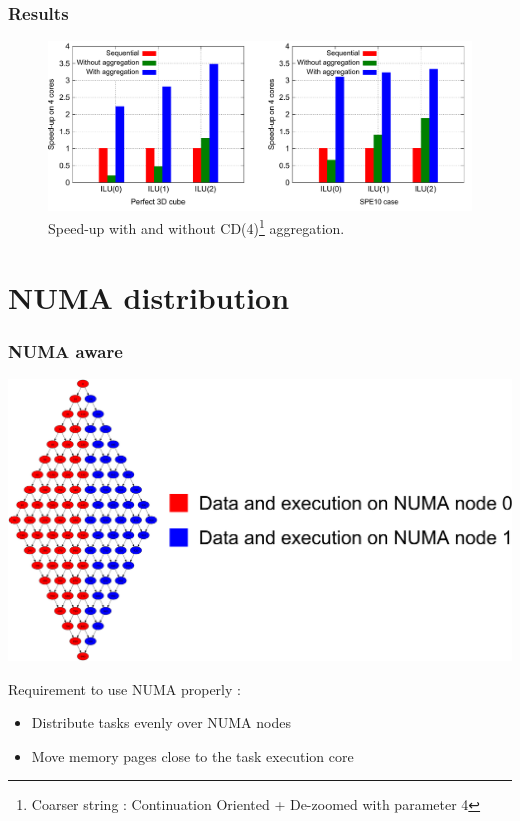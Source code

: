 \documentclass{beamer}
\begin{document}
\begin{frame}
  \frametitle{Results}
  
  \begin{figure}[t!]
    \centering
    \includegraphics[width=\linewidth]{agg_cube_100_spe10}
    \caption{Speed-up with and without CD(4)\footnote{Coarser string : Continuation Oriented + De-zoomed with parameter 4} aggregation.}
  \end{figure}
\end{frame}



\section{NUMA distribution}
\begin{frame}
  \frametitle{NUMA aware}

  \centerline{\includegraphics[width=0.8\linewidth]{numa_rb}}

  Requirement to use NUMA properly :
  \begin{itemize}
    \item Distribute tasks evenly over NUMA nodes
    \item Move memory pages close to the task execution core
  \end{itemize}
\end{frame}
\end{document}
